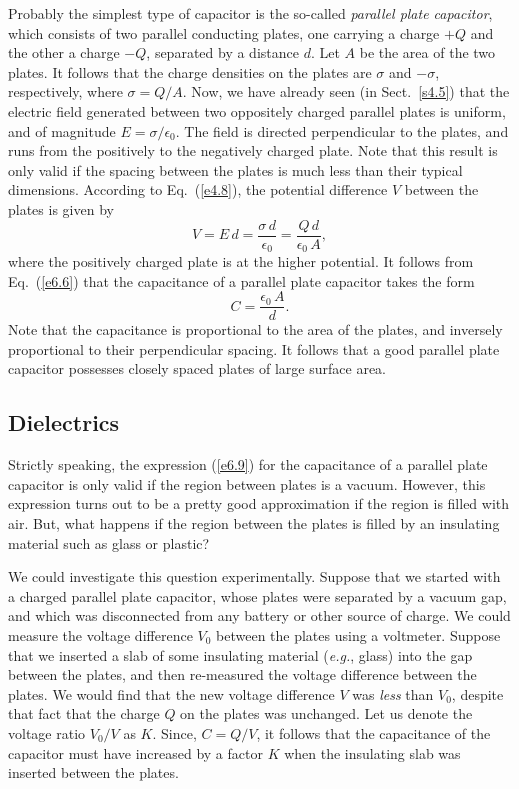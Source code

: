 Probably the simplest type of capacitor is the so-called 
{\em parallel plate capacitor},
which consists of two parallel conducting plates, one carrying a charge $+Q$
and the other a charge $-Q$, separated by a distance $d$. Let $A$ be the area
of the two plates. It follows that the charge densities on the plates are
$\sigma$ and $-\sigma$, respectively, where $\sigma=Q/A$. Now, we have
already seen (in Sect.~\ref{s4.5}) that the electric field generated between
two oppositely charged parallel plates is uniform, and of magnitude
$E= \sigma/\epsilon_0$. The field is directed perpendicular to the
plates, and runs from the positively  to the negatively charged plate. 
Note that this result is only valid if the spacing between the plates is
much less than their typical dimensions.
According to Eq.~(\ref{e4.8}), the potential difference $V$ between the plates is
given by 
\begin{equation}
V = E \,d = \frac{\sigma\,d}{\epsilon_0} = \frac{Q\,d}{\epsilon_0\,A},
\end{equation}
where the positively charged plate is at the higher potential. It
follows from Eq.~(\ref{e6.6}) that the capacitance of a parallel plate capacitor
takes the form
\begin{equation}\label{e6.9}
C = \frac{\epsilon_0\,A}{d}.
\end{equation}
Note that the capacitance is proportional to the area of the plates, and
inversely proportional to their perpendicular spacing. It follows
that a good parallel plate capacitor possesses closely spaced plates of
large surface area. 

\subsection{Dielectrics}
Strictly speaking, the expression (\ref{e6.9}) for the capacitance of a parallel
plate capacitor is only valid if the region between
plates is a vacuum.
However, this expression turns out to be a pretty good approximation if the
region is filled with air. But, what happens if the 
region between the plates is filled  by an insulating
material such as glass or plastic? 

We could  investigate this question experimentally. 
Suppose that we started with a charged parallel plate capacitor, whose plates
were separated by a vacuum gap,  and which was disconnected from any battery
or other source of charge. We could measure the voltage difference $V_0$ between  the plates
using a voltmeter. Suppose that we 
inserted a slab of some insulating material ({\em e.g.}, glass)  into the gap between the plates, and then re-measured the
voltage difference between the plates. 
 We would find that the new voltage difference $V$ 
was {\em less}\/ than $V_0$, despite that fact that the charge $Q$ on the plates
was unchanged. Let  us denote the voltage ratio $V_0/V$ as $K$. 
Since, $C=Q/V$, it follows that
 the capacitance of the capacitor must have increased by a
factor $K$ when the insulating slab was inserted between the plates. 

